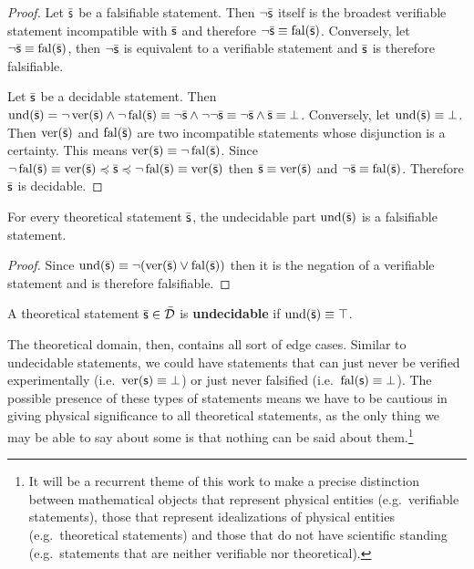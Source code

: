 \documentclass[11pt,letterpaper,fleqn]{memoir} %
\begin{document}
\begin{mathSection}
\begin{proof}
	Let $\bar{\mathsf{s}}$ be a falsifiable statement. Then $\neg\bar{\mathsf{s}}$ itself is the broadest verifiable statement incompatible with $\bar{\mathsf{s}}$ and therefore $\neg\bar{\mathsf{s}} \equiv \operatorname{fal}(\bar{\mathsf{s}})$. Conversely, let $\neg\bar{\mathsf{s}} \equiv \operatorname{fal}(\bar{\mathsf{s}})$, then $\neg\bar{\mathsf{s}}$ is equivalent to a verifiable statement and $\bar{\mathsf{s}}$ is therefore falsifiable.
	
	Let $\bar{\mathsf{s}}$ be a decidable statement. Then $\operatorname{und}(\bar{\mathsf{s}}) = \neg \operatorname{ver}(\bar{\mathsf{s}}) \wedge \neg \operatorname{fal}(\bar{\mathsf{s}}) \equiv \neg \bar{\mathsf{s}} \wedge \neg \neg \bar{\mathsf{s}} \equiv \neg \bar{\mathsf{s}} \wedge \bar{\mathsf{s}} \equiv \bot$. Conversely, let $\operatorname{und}(\bar{\mathsf{s}}) \equiv \bot$. Then $\operatorname{ver}(\bar{\mathsf{s}})$ and $\operatorname{fal}(\bar{\mathsf{s}})$ are two incompatible statements whose disjunction is a certainty. This means $\operatorname{ver}(\bar{\mathsf{s}}) \equiv \neg \operatorname{fal}(\bar{\mathsf{s}})$. Since $\neg \operatorname{fal}(\bar{\mathsf{s}}) \equiv \operatorname{ver}(\bar{\mathsf{s}}) \preccurlyeq \bar{\mathsf{s}} \preccurlyeq \neg \operatorname{fal}(\bar{\mathsf{s}}) \equiv \operatorname{ver}(\bar{\mathsf{s}})$ then $\bar{\mathsf{s}} \equiv \operatorname{ver}(\bar{\mathsf{s}})$ and $\neg\bar{\mathsf{s}} \equiv \operatorname{fal}(\bar{\mathsf{s}})$. Therefore $\bar{\mathsf{s}}$ is decidable.	
\end{proof}

\begin{coro}
	For every theoretical statement $\bar{\mathsf{s}}$, the undecidable part $\operatorname{und}(\bar{\mathsf{s}})$ is a falsifiable statement.
\end{coro}

\begin{proof}
	Since $\operatorname{und}(\bar{\mathsf{s}}) \equiv \neg (\operatorname{ver}(\bar{\mathsf{s}}) \vee \operatorname{fal}(\bar{\mathsf{s}}))$ then it is the negation of a verifiable statement and is therefore falsifiable.
\end{proof}

\begin{defn}
	A theoretical statement $\bar{\mathsf{s}} \in \bar{\mathcal{D}}$ is \textbf{undecidable} if $\operatorname{und}(\bar{\mathsf{s}}) \equiv \top$.
\end{defn}
\end{mathSection}

The theoretical domain, then, contains all sort of edge cases. Similar to undecidable statements, we could have statements that can just never be verified experimentally (i.e.~$\operatorname{ver}(\mathsf{s}) \equiv \bot$) or just never falsified (i.e.~$\operatorname{fal}(\mathsf{s}) \equiv \bot$). The possible presence of these types of statements means we have to be cautious in giving physical significance to all theoretical statements, as the only thing we may be able to say about some is that nothing can be said about them.\footnote{It will be a recurrent theme of this work to make a precise distinction between mathematical objects that represent physical entities (e.g.~verifiable statements), those that represent idealizations of physical entities (e.g.~theoretical statements) and those that do not have scientific standing (e.g.~statements that are neither verifiable nor theoretical).}
\end{document}
